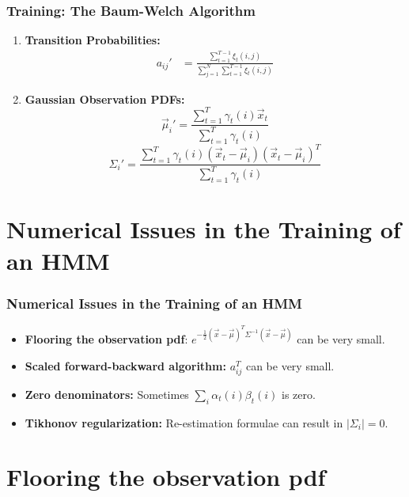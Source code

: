 \documentclass{beamer}
\begin{document}
\begin{frame}
  \frametitle{Training: The Baum-Welch Algorithm}

  \begin{enumerate}
  \item {\bf Transition Probabilities:}
    \begin{align*}
      a_{ij}' &=\frac{\sum_{t=1}^{T-1} \xi_t(i,j)}{\sum_{j=1}^N\sum_{t=1}^{T-1}\xi_t(i,j)}
    \end{align*}
  \item {\bf Gaussian Observation PDFs:}
    \begin{displaymath}
      \vec\mu_{i}' = \frac{\sum_{t=1}^T\gamma_t(i)\vec{x}_{t}}{\sum_{t=1}^T\gamma_t(i)}
    \end{displaymath}
    \begin{displaymath}
      \Sigma_{i}' = \frac{\sum_{t=1}^T\gamma_t(i)(\vec{x}_{t}-\vec\mu_{i})(\vec{x}_t-\vec\mu_i)^T}{\sum_{t=1}^T\gamma_t(i)}
    \end{displaymath}
  \end{enumerate}
\end{frame}

\section[Issues]{Numerical Issues in the Training of an HMM}
\setcounter{subsection}{1}

\begin{frame}
  \frametitle{Numerical Issues in the  Training  of an HMM}
  \begin{itemize}
  \item {\bf Flooring the observation pdf}: $e^{-\frac{1}{2}(\vec{x}-\vec\mu)^T\Sigma^{-1}(\vec{x}-\vec\mu)}$ can be very small.
  \item {\bf Scaled forward-backward algorithm:} $a_{ij}^T$ can be very small.
  \item {\bf Zero denominators:} Sometimes $\sum_i\alpha_t(i)\beta_t(i)$ is zero.
  \item {\bf Tikhonov regularization:} Re-estimation formulae can result in $|\Sigma_i|=0$.
  \end{itemize}
\end{frame}

\section[Observations]{Flooring the observation pdf}
\setcounter{subsection}{1}
\end{document}
